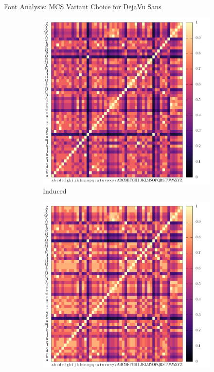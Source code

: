 \begin{frame}{Font Analysis: MCS Variant Choice for DejaVu Sans}
	\begin{figure}
		\centering
		\begin{subfigure}[b]{0.3\linewidth}
			\includegraphics[width=\linewidth, height=0.9\linewidth]{../tables/dejavu-sans/induced-conf-nrm.pdf}
			\caption{
				Induced
				\label{fig:heat:filter:induced}
			}
		\end{subfigure}
		\begin{subfigure}[b]{0.3\linewidth}
			\includegraphics[width=\linewidth, height=0.9\linewidth]{../tables/dejavu-sans/edgecountinc-conf-nrm.pdf}

\end{subfigure}
\end{figure}
\end{frame}
